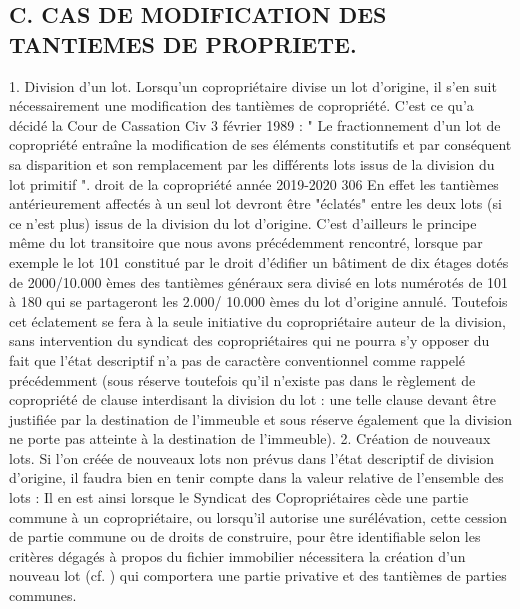 	\subsection{C. CAS DE MODIFICATION DES TANTIEMES DE PROPRIETE.}
	
		1. Division d'un lot.
		Lorsqu'un copropriétaire divise un lot d'origine, il s’en suit nécessairement une modification des tantièmes de copropriété.
		C'est ce qu'a décidé la Cour de Cassation Civ 3 février 1989 :
		" Le fractionnement d'un lot de copropriété entraîne la modification de ses éléments constitutifs et par conséquent sa disparition et son remplacement par les différents lots issus de la division du lot primitif ".
		droit de la copropriété année 2019-2020
		306
		En effet les tantièmes antérieurement affectés à un seul lot devront être "éclatés" entre les deux lots (si ce n'est plus) issus de la division du lot d'origine.
		C'est d'ailleurs le principe même du lot transitoire que nous avons précédemment rencontré, lorsque par exemple le lot 101 constitué par le droit d'édifier un bâtiment de dix étages dotés de 2000/10.000 èmes des tantièmes généraux sera divisé en lots numérotés de 101 à 180 qui se partageront les 2.000/ 10.000 èmes du lot d'origine annulé.
		Toutefois cet éclatement se fera à la seule initiative du copropriétaire auteur de la division, sans intervention du syndicat des copropriétaires qui ne pourra s'y opposer du fait que l’état descriptif n'a pas de caractère conventionnel comme rappelé précédemment (sous réserve toutefois qu’il n’existe pas dans le règlement de copropriété de clause interdisant la division du lot : une telle clause devant être justifiée par la destination de l’immeuble et sous réserve également que la division ne porte pas atteinte à la destination de l’immeuble).
		2. Création de nouveaux lots.
		Si l'on créée de nouveaux lots non prévus dans l'état descriptif de division d'origine, il faudra bien en tenir compte dans la valeur relative de l'ensemble des lots :
		Il en est ainsi lorsque le Syndicat des Copropriétaires cède une partie commune à un copropriétaire, ou lorsqu'il autorise une surélévation, cette cession de partie commune ou de droits de construire, pour être identifiable selon les critères dégagés à propos du fichier immobilier nécessitera la création d'un nouveau lot (cf. ) qui comportera une partie privative et des tantièmes de parties communes.
